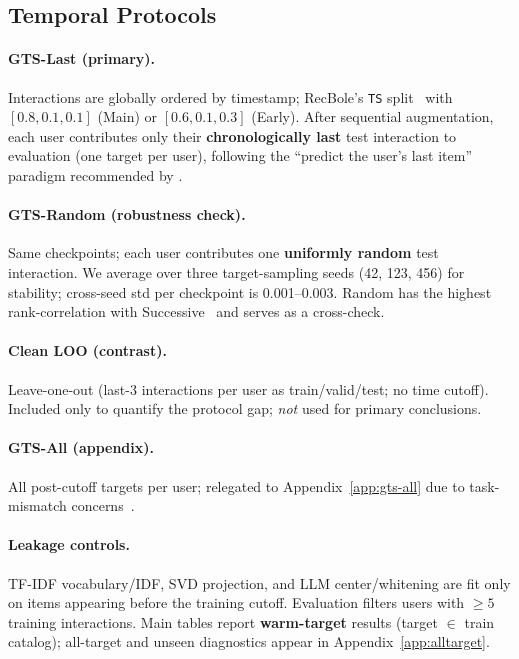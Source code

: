 \documentclass[sigconf,natbib=true,anonymous]{acmart}
\newcommand{\tfidf}{\textsc{TF-IDF}\xspace}
\begin{document}
\subsection{Temporal Protocols}
\label{sec:protocol}

\paragraph{GTS-Last (primary).}
Interactions are globally ordered by timestamp; RecBole's \texttt{TS} split~\cite{zhao2021recbole} with $[0.8,0.1,0.1]$ (Main) or $[0.6,0.1,0.3]$ (Early).
After sequential augmentation, each user contributes only their \textbf{chronologically last} test interaction to evaluation (one target per user), following the ``predict the user's last item'' paradigm recommended by \citet{liang2024timetosplit}.

\paragraph{GTS-Random (robustness check).}
Same checkpoints; each user contributes one \textbf{uniformly random} test interaction.  We average over three target-sampling seeds (42, 123, 456) for stability; cross-seed std per checkpoint is 0.001--0.003.
Random has the highest rank-correlation with Successive~\cite{liang2024timetosplit} and serves as a cross-check.

\paragraph{Clean LOO (contrast).}
Leave-one-out (last-3 interactions per user as train/valid/test; no time cutoff).
Included only to quantify the protocol gap; \emph{not} used for primary conclusions.

\paragraph{GTS-All (appendix).}
All post-cutoff targets per user; relegated to Appendix~\ref{app:gts-all} due to task-mismatch concerns~\cite{liang2024timetosplit}.

\paragraph{Leakage controls.}
\tfidf vocabulary/IDF, SVD projection, and LLM center/whitening are fit only on items appearing before the training cutoff.
Evaluation filters users with $\ge 5$ training interactions.
Main tables report \textbf{warm-target} results (target $\in$ train catalog); all-target and unseen diagnostics appear in Appendix~\ref{app:alltarget}.
\end{document}
